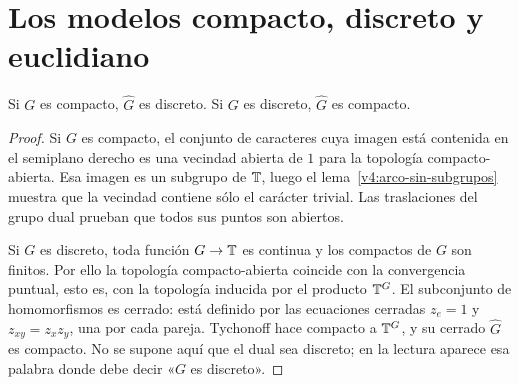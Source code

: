 \section{Los modelos compacto, discreto y euclidiano}
\begin{teorema}\label{v4:dual-compacto-discreto}
Si $G$ es compacto, $\widehat G$ es discreto. Si $G$ es discreto, $\widehat G$ es compacto.
\end{teorema}
\begin{proof}
Si $G$ es compacto, el conjunto de caracteres cuya imagen está contenida en el semiplano derecho es una vecindad abierta de $1$ para la topología compacto-abierta. Esa imagen es un subgrupo de $\mathbb T$, luego el lema~\ref{v4:arco-sin-subgrupos} muestra que la vecindad contiene sólo el carácter trivial. Las traslaciones del grupo dual prueban que todos sus puntos son abiertos.

Si $G$ es discreto, toda función $G\to\mathbb T$ es continua y los compactos de $G$ son finitos. Por ello la topología compacto-abierta coincide con la convergencia puntual, esto es, con la topología inducida por el producto $\mathbb T^G$. El subconjunto de homomorfismos es cerrado: está definido por las ecuaciones cerradas $z_e=1$ y $z_{xy}=z_xz_y$, una por cada pareja. Tychonoff hace compacto a $\mathbb T^G$, y su cerrado $\widehat G$ es compacto. No se supone aquí que el dual sea discreto; en la lectura aparece esa palabra donde debe decir «$G$ es discreto».
\end{proof}

